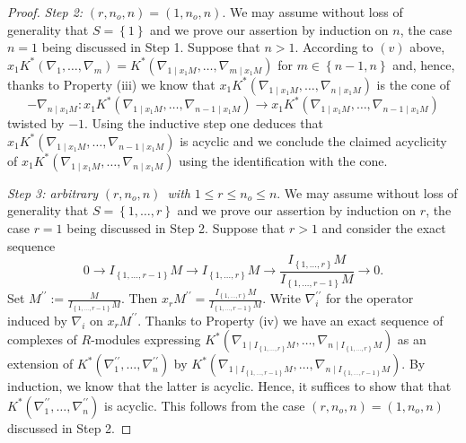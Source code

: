 \documentclass[asterisque,english]{smfart}
\begin{document}
\begin{proof}
\emph{Step 2: }$\left( r,n_{o},n\right) =\left( 1,n_{o},n\right) $. We may
assume without loss of generality that $S=\left\{ 1\right\} $ and we prove
our assertion by induction on $n$, the case $n=1$ being discussed in Step 1. 
Suppose that $n>1$. According to $\left( v\right) $
above, $x_{1}K^\ast\left( \nabla _{1},\ldots,\nabla _{m}\right) =K^{\ast
}\left( \nabla _{1\mid x_{1}M},\ldots,\nabla _{m\mid x_{1}M}\right) $ for $m\in
\left\{ n-1,n\right\} $ and, hence, thanks to Property (iii) we know
that $x_{1}K^\ast\left( \nabla _{1\mid
x_{1}M},\ldots,\nabla _{n\mid x_{1}M}\right) $ is the cone of
$$ -\nabla
_{n\mid x_{1}M}:x_{1}K^\ast\left( \nabla _{1\mid x_{1}M},\ldots,\nabla
_{n-1\mid x_{1}M}\right) \rightarrow x_{1}K^\ast\left( \nabla _{1\mid
x_{1}M},\ldots,\nabla _{n-1\mid x_{1}M}\right)$$twisted by $-1$. Using the inductive step one deduces that  $
x_{1}K^\ast\left( \nabla _{1\mid x_{1}M},\ldots,\nabla _{n-1\mid
x_{1}M}\right) $ is acyclic and we conclude the claimed acyclicity of $
x_{1}K^\ast\left( \nabla _{1\mid x_{1}M},\ldots,\nabla _{n\mid
x_{1}M}\right) $ using the identification with the cone.

\emph{Step 3: arbitrary }$\left( r,n_{o},n\right) $\emph{\ with }$1\leq
r\leq n_{o}\leq n$. We may assume without loss of generality that $S=\left\{
1,\ldots,r\right\} $ and we prove our assertion by induction on $r$, the case $
r=1$ being discussed in Step 2. Suppose that $r>1$ and consider
the exact sequence
\begin{equation*}
0\longrightarrow I_{\left\{ 1,\ldots,r-1\right\} }M\longrightarrow I_{\left\{
1,\ldots,r\right\} }M\longrightarrow \frac{I_{\left\{ 1,\ldots,r\right\} }M}{
I_{\left\{ 1,\ldots,r-1\right\} }M}\longrightarrow 0\text{.}
\end{equation*}
Set $M^{\prime \prime }:=\frac{M}{I_{\left\{ 1,\ldots,r-1\right\} }M}$. Then $
x_{r}M^{\prime \prime }=\frac{I_{\left\{ 1,\ldots,r\right\} }M}{I_{\left\{
1,\ldots,r-1\right\} }M}$. Write $\nabla
_{i}^{\prime \prime }$ for the operator induced by $\nabla_i$ on $x_{r}M^{\prime \prime }$.
Thanks to Property (iv)  we have an exact sequence of complexes of $R$-modules expressing $K^\ast\left( \nabla _{1\mid I_{\left\{
1,\ldots,r\right\} }M},\ldots,\nabla _{n\mid I_{\left\{ 1,\ldots,r\right\} }M}\right)$ as an extension of 
$K^\ast\left( \nabla _{1}^{\prime \prime },\ldots,\nabla
_{n}^{\prime \prime }\right)$ by $K^\ast\left( \nabla _{1\mid I_{\left\{
1,\ldots,r-1\right\} }M},\ldots,\nabla _{n\mid I_{\left\{ 1,\ldots,r-1\right\}
}M}\right) $.  By induction, we know that the latter is acyclic. Hence, it suffices to show that  that $K^\ast\left( \nabla _{1}^{\prime \prime },\ldots,\nabla
_{n}^{\prime \prime }\right)$ is acyclic. This follows from the case $\left(
r,n_{o},n\right) =\left( 1,n_{o},n\right) $ discussed in Step 2.
\end{proof}
\end{document}

